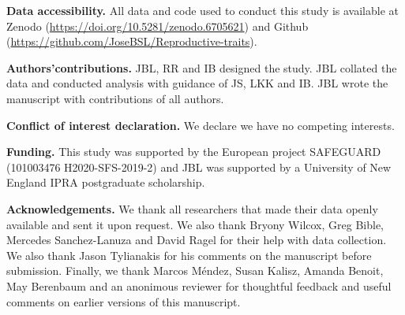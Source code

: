 \documentclass[
  12pt,
  a4paper,
]{article}
\begin{document}
\textbf{Data accessibility.} All data and code used to conduct this study is available at Zenodo (\url{https://doi.org/10.5281/zenodo.6705621}) and Github (\url{https://github.com/JoseBSL/Reproductive-traits}).

\textbf{Authors'contributions.} JBL, RR and IB designed the study. JBL collated the data and conducted analysis with guidance of JS, LKK and IB. JBL wrote the manuscript with contributions of all authors.

\textbf{Conflict of interest declaration.} We declare we have no competing interests.

\textbf{Funding.} This study was supported by the European project SAFEGUARD (101003476 H2020-SFS-2019-2) and JBL was supported by a University of New England IPRA postgraduate scholarship.

\textbf{Acknowledgements.} We thank all researchers that made their data openly available and sent it upon request. We also thank Bryony Wilcox, Greg Bible, Mercedes Sanchez-Lanuza and David Ragel for their help with data collection. We also thank Jason Tylianakis for his comments on the manuscript before submission. Finally, we thank Marcos Méndez, Susan Kalisz, Amanda Benoit, May Berenbaum and an anonimous reviewer for thoughtful feedback and useful comments on earlier versions of this manuscript.
\end{document}
